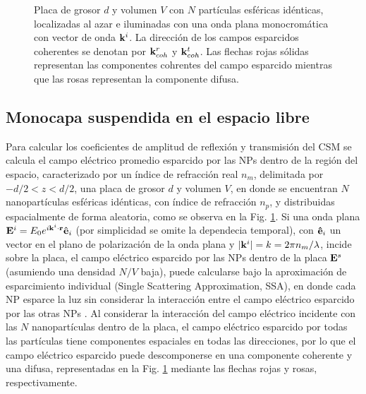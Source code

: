 \begin{figure}[h!]
	\caption{Placa de grosor $d$ y volumen $V$ con $N$ partículas esféricas  idénticas, localizadas al azar e iluminadas con una onda plana monocromática con vector de onda $\vb{k}^i$. La dirección de los campos esparcidos coherentes se denotan por $\vb{k}^r_{coh}$ y $\vb{k}^t_{coh}$. Las flechas rojas sólidas representan las componentes cohrentes del campo esparcido mientras que las rosas representan la componente difusa. }\label{fig:CSM-Slab}
	\end{figure} 
 
\subsection{Monocapa suspendida en el espacio libre}
 
Para calcular los coeficientes de amplitud de reflexión y transmisión del CSM se calcula el campo eléctrico promedio esparcido por las NPs dentro de la región del espacio, caracterizado por un índice de refracción real $n_m$, delimitada por  $-d/2<z<d/2$, una placa de grosor $d$ y volumen $V$, en donde se encuentran $N$ nanopartículas esféricas idénticas, con índice de refracción $n_p$, y distribuidas espacialmente de forma aleatoria, como se observa en la Fig. \ref{fig:CSM-Slab}. Si una onda plana $\vb{E}^i = E_0 e^{i\vb{k}^i\cdot\vb{r}}\vu{e}_i$ (por simplicidad se omite la dependecia temporal), con $\vu{e}_i$ un vector en el plano de polarización de la onda plana y $|\vb{k}^i| = k = 2\pi n_m /\lambda$, incide sobre la placa, el campo eléctrico esparcido  por las NPs dentro de la placa $\vb{E}^s$ (asumiendo una densidad $N/V$ baja), puede calcularse bajo la aproximación de esparcimiento individual (Single Scattering Approximation, SSA), en donde cada NP esparce la luz sin considerar la interacción entre el campo eléctrico esparcido por las otras NPs \cite{barrera2003coherent}. Al considerar la interacción del campo eléctrico incidente con las $N$ nanopartículas dentro de la placa, el campo eléctrico esparcido por todas las partículas tiene componentes espaciales en todas las direcciones, por lo que el campo eléctrico esparcido puede descomponerse en una componente coherente y una difusa, representadas en la Fig. \ref{fig:CSM-Slab} mediante las flechas rojas y rosas, respectivamente.


